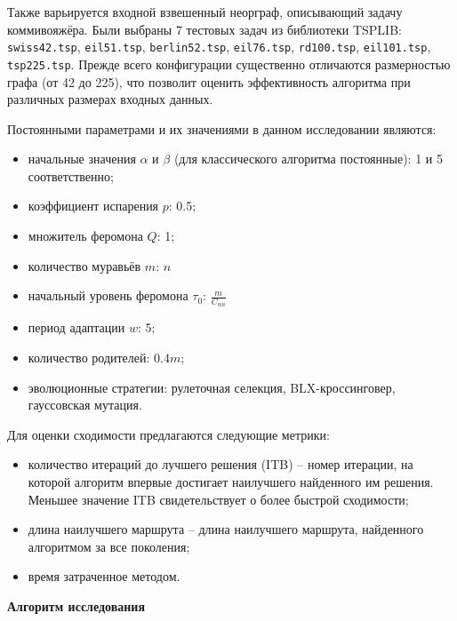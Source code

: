 Также варьируется входной взвешенный неорграф, описывающий задачу коммивояжёра. Были выбраны 7 тестовых задач из библиотеки TSPLIB: \texttt{swiss42.tsp}, \texttt{eil51.tsp}, \texttt{berlin52.tsp}, \texttt{eil76.tsp}, \texttt{rd100.tsp}, \texttt{eil101.tsp}, \texttt{tsp225.tsp}. Прежде всего конфигурации существенно отличаются размерностью графа (от 42 до 225), что позволит оценить эффективность алгоритма при различных размерах входных данных.

Постоянными параметрами и их значениями в данном исследовании являются: 
\begin{itemize}
	\item начальные значения $\alpha$ и $\beta$ (для классического алгоритма постоянные): 1 и 5 соответственно;
	\item коэффициент испарения $p$: 0.5;
	\item множитель феромона $Q$: 1;
	\item количество муравьёв $m$: $n$
	\item начальный уровень феромона $\tau_0$: $\frac{m}{C_{nn}}$
	\item период адаптации $w$: 5;
	\item количество родителей: $0.4m$;
	\item эволюционные стратегии: рулеточная селекция, BLX-кроссинговер, гауссовская мутация.
\end{itemize}

Для оценки сходимости предлагаются следующие метрики:
\begin{itemize}
	\item количество итераций до лучшего решения (ITB) -- номер итерации, на которой алгоритм впервые достигает наилучшего найденного им решения. Меньшее значение ITB свидетельствует о более быстрой сходимости;
	\item длина наилучшего маршрута -- длина наилучшего маршрута, найденного алгоритмом за все поколения;
	\item время затраченное методом.
\end{itemize}

\textbf{Алгоритм исследования}

